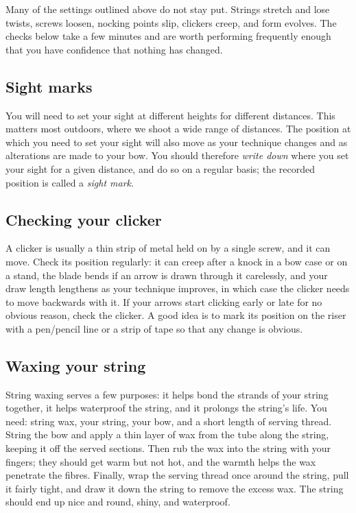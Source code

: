\documentclass[11pt]{article}
\let\plainsubsection\subsection
\renewcommand{\subsection}{\FloatBarrier\plainsubsection}
\begin{document}
Many of the settings outlined above do not stay put. Strings stretch and lose twists, screws loosen, nocking points slip, clickers creep, and form evolves. The checks below take a few minutes and are worth performing frequently enough that you have confidence that nothing has changed.

\subsection{Sight marks}
You will need to set your sight at different heights for different distances. This matters most outdoors, where we shoot a wide range of distances. The position at which you need to set your sight will also move as your technique changes and as alterations are made to your bow. You should therefore \emph{write down} where you set your sight for a given distance, and do so on a regular basis; the recorded position is called a \emph{sight mark}.

\subsection{Checking your clicker}
A clicker is usually a thin strip of metal held on by a single screw, and it can move. Check its position regularly: it can creep after a knock in a bow case or on a stand, the blade bends if an arrow is drawn through it carelessly, and your draw length lengthens as your technique improves, in which case the clicker needs to move backwards with it. If your arrows start clicking early or late for no obvious reason, check the clicker. A good idea is to mark its position on the riser with a pen/pencil line or a strip of tape so that any change is obvious.

\subsection{Waxing your string}
String waxing serves a few purposes: it helps bond the strands of your string together, it helps waterproof the string, and it prolongs the string's life. You need: string wax, your string, your bow, and a short length of serving thread. String the bow and apply a thin layer of wax from the tube along the string, keeping it off the served sections. Then rub the wax into the string with your fingers; they should get warm but not hot, and the warmth helps the wax penetrate the fibres. Finally, wrap the serving thread once around the string, pull it fairly tight, and draw it down the string to remove the excess wax. The string should end up nice and round, shiny, and waterproof.
\end{document}
